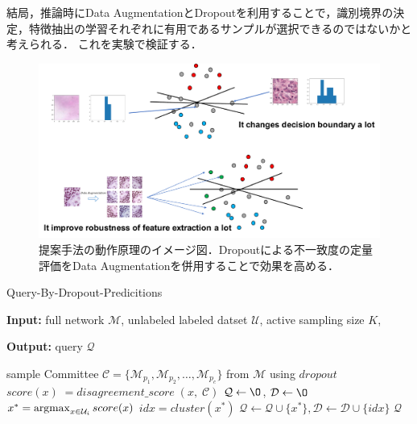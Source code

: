 結局，推論時にData AugmentationとDropoutを利用することで，識別境界の決定，特徴抽出の学習それぞれに有用であるサンプルが選択できるのではないかと考えられる．
これを実験で検証する．

\begin{figure}[tbp]
     \begin{center}
      \includegraphics[width=120mm]{figures/how_it_works.pdf}
     \end{center}
    \caption{\label{fig:how_it_works}提案手法の動作原理のイメージ図．Dropoutによる不一致度の定量評価をData Augmentationを併用することで効果を高める．}
\end{figure}


\begin{algorithm}[h]
    \caption{Query-By-Dropout-Predicitions}
    \label{algo:qbdp}
    \begin{algorithmic}
        \STATE \textbf{Input: } 
        full network $\mathcal{M}$,
        unlabeled labeled datset $\mathcal{U}$,
        active sampling size $K$,
    \end{algorithmic}

    \begin{algorithmic}
        \STATE \textbf{Output: } query $\mathcal{Q}$
    \end{algorithmic}
    
    \begin{algorithmic}[1]
        \STATE sample Committee $\mathcal{C} = \{\mathcal{M}_{p_1}, \mathcal{M}_{p_2}, \dots, \mathcal{M}_{p_c} \}$ from $\mathcal{M}$ using $dropout$ 
            \STATE $score (x) \; = disagreement\_score \; (x, \; \mathcal{C}) $
        \ENDFOR
        \STATE $\mathcal{Q} \leftarrow \O$, $\mathcal{D} \leftarrow \O$
        \STATE $x^{\ast} = \argmax_{x \in \mathcal{U}_i} score(x)$
        \STATE $idx = cluster(x^{\ast})$
        \STATE $\mathcal{Q} \leftarrow \mathcal{Q} \cup \{x^{\ast}\}, \mathcal{D} \leftarrow \mathcal{D} \cup \{idx\}$
        \ENDIF
        \ENDWHILE
        \RETURN $\mathcal{Q}$
    \end{algorithmic}
  \end{algorithm}


